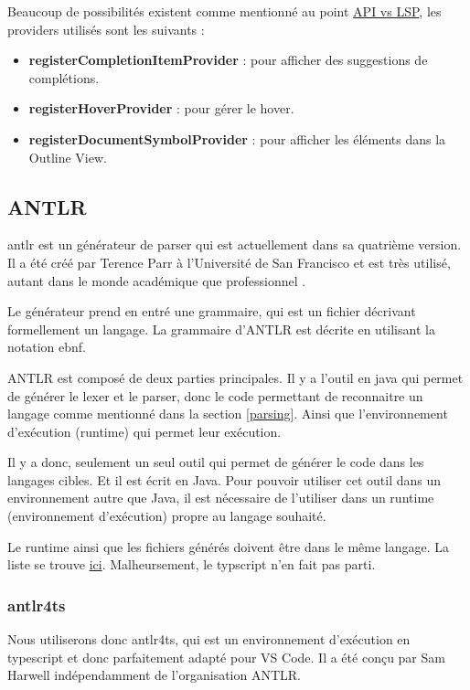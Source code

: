 \documentclass[
    iict, %
    il, %
]{heig-tb}
\begin{document}
Beaucoup de possibilités existent comme mentionné au point \hyperref[api vs lsp]{API vs LSP}, les providers utilisés sont les suivants :
\begin{itemize}
    \item \textbf{registerCompletionItemProvider} : pour afficher des suggestions de complétions.
    \item \textbf{registerHoverProvider} : pour gérer le hover.
    \item \textbf{registerDocumentSymbolProvider} : pour afficher les éléments dans la Outline View.
\end{itemize}

\subsection{ANTLR}

\Gls{antlr} est un générateur de parser qui est actuellement dans sa quatrième version.
Il a été créé par Terence Parr à l'Université de San Francisco et est très utilisé, autant dans le monde académique que professionnel \cite{antlr}.

Le générateur prend en entré une grammaire, qui est un fichier décrivant formellement un langage. La grammaire d'ANTLR est décrite en utilisant la notation \Gls{ebnf}.

ANTLR est composé de deux parties principales. Il y a l'outil en java qui permet de générer le lexer et le parser, donc le code permettant de reconnaitre un langage comme mentionné dans la section \ref{parsing}.
Ainsi que l'environnement d'exécution (runtime) qui permet leur exécution.

Il y a donc, seulement un seul outil qui permet de générer le code dans les langages cibles. Et il est écrit en Java.
Pour pouvoir utiliser cet outil dans un environnement autre que Java, il est nécessaire de l'utiliser dans un runtime (environnement d'exécution) propre au langage souhaité.

Le runtime ainsi que les fichiers générés doivent être dans le même langage. La liste se trouve \href{https://github.com/antlr/antlr4/blob/master/doc/targets.md}{ici}.
Malheursement, le typscript n'en fait pas parti.

\subsubsection{antlr4ts}
Nous utiliserons donc antlr4ts, qui est un environnement d'exécution en typescript et donc parfaitement adapté pour VS Code.
Il a été conçu par Sam Harwell indépendamment de l'organisation ANTLR.
\end{document}
